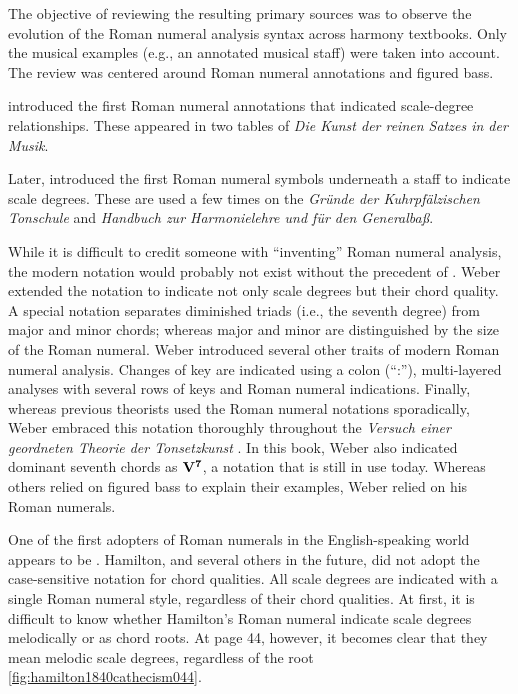 The objective of reviewing the resulting primary sources was to observe the evolution of the Roman numeral analysis syntax across harmony textbooks.
Only the musical examples (e.g., an annotated musical staff) were taken into account.
The review was centered around Roman numeral annotations and figured bass.

\textcite{kirnberger1774kunst} introduced the first Roman numeral annotations that indicated scale-degree relationships.
These appeared in two tables of \emph{Die Kunst der reinen Satzes in der Musik}.

Later, \textcite{vogler1778grunde, vogler1802handbuch} introduced the first Roman numeral symbols underneath a staff to indicate scale degrees.
These are used a few times on the \emph{Gründe der Kuhrpfälzischen Tonschule} and \emph{Handbuch zur Harmonielehre und für den Generalbaß}.

While it is difficult to credit someone with ``inventing'' Roman numeral analysis, the modern notation would probably not exist without the precedent of \textcite{weber1817versuch}.
Weber extended the notation to indicate not only scale degrees but their chord quality.
A special notation separates diminished triads (i.e., the seventh degree) from major and minor chords; whereas major and minor are distinguished by the size of the Roman numeral.
Weber introduced several other traits of modern Roman numeral analysis.
Changes of key are indicated using a colon (``:''), multi-layered analyses with several rows of keys and Roman numeral indications.
Finally, whereas previous theorists used the Roman numeral notations sporadically, Weber embraced this notation thoroughly throughout the \emph{Versuch einer geordneten Theorie der Tonsetzkunst} \textcite{weber1817versuch}.
In this book, Weber also indicated dominant seventh chords as $\textbf{V}\relax\relax{\footnotesize {}^\textbf{7}\relax\relax}$, a notation that is still in use today.
Whereas others relied on figured bass to explain their examples, Weber relied on his Roman numerals.

One of the first adopters of Roman numerals in the English-speaking world appears to be \textcite{hamilton1840catechism}.
Hamilton, and several others in the future, did not adopt the case-sensitive notation for chord qualities.
All scale degrees are indicated with a single Roman numeral style, regardless of their chord qualities.
At first, it is difficult to know whether Hamilton's Roman numeral indicate scale degrees melodically or as chord roots.
At page 44, however, it becomes clear that they mean melodic scale degrees, regardless of the root \ref{fig:hamilton1840cathecism044}.

